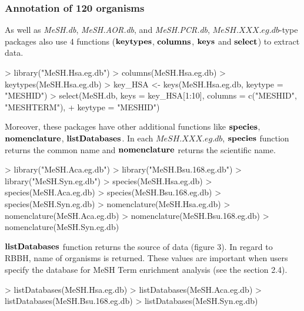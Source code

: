 \documentclass[11pt]{article}
\newcommand{\Rpackage}[1]{{\textit{#1}}}
\begin{document}
\subsubsection{Annotation of 120 organisms}
As well as \Rpackage{MeSH.db},  \Rpackage{MeSH.AOR.db}, and \Rpackage{MeSH.PCR.db}, $MeSH.XXX.eg.db$-type packages also use 4 functions ($\bf{keytypes}$, $\bf{columns}$, $\bf{keys}$ and $\bf{select}$) to extract data.

\begin{center}
\begin{Schunk}
\begin{Sinput}
> library("MeSH.Hsa.eg.db")
> columns(MeSH.Hsa.eg.db)
> keytypes(MeSH.Hsa.eg.db)
> key_HSA <- keys(MeSH.Hsa.eg.db, keytype = "MESHID")
> select(MeSH.db, keys = key_HSA[1:10], columns = c("MESHID", "MESHTERM"), 
+     keytype = "MESHID")
\end{Sinput}
\end{Schunk}
\end{center}
Moreover, these packages have other additional functions like $\bf{species}$, $\bf{nomenclature}$, $\bf{listDatabases}$.
In each $MeSH.XXX.eg.db$, $\bf{species}$ function returns the common name and $\bf{nomenclature}$ returns the scientific name.
\begin{center}
\begin{Schunk}
\begin{Sinput}
> library("MeSH.Aca.eg.db")
> library("MeSH.Bsu.168.eg.db")
> library("MeSH.Syn.eg.db")
> species(MeSH.Hsa.eg.db)
> species(MeSH.Aca.eg.db)
> species(MeSH.Bsu.168.eg.db)
> species(MeSH.Syn.eg.db)
> nomenclature(MeSH.Hsa.eg.db)
> nomenclature(MeSH.Aca.eg.db)
> nomenclature(MeSH.Bsu.168.eg.db)
> nomenclature(MeSH.Syn.eg.db)
\end{Sinput}
\end{Schunk}
\end{center}

$\bf{listDatabases}$ function returns the source of data (figure 3). In regard to RBBH, name of organisms is returned. These values are important when users specify the database for MeSH Term enrichment analysis (see the section 2.4).

\begin{center}
\begin{Schunk}
\begin{Sinput}
> listDatabases(MeSH.Hsa.eg.db)
> listDatabases(MeSH.Aca.eg.db)
> listDatabases(MeSH.Bsu.168.eg.db)
> listDatabases(MeSH.Syn.eg.db)
\end{Sinput}
\end{Schunk}
\end{center}
\end{document}
